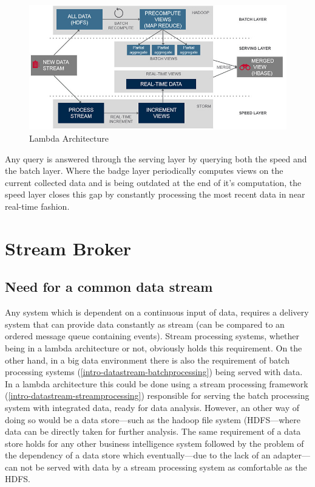 \begin{figure}[H]
    \centering
    \includegraphics[width=1.0\textwidth]{images/lambda-architecture.jpg}
    \caption{Lambda Architecture}
    \label{fig:lambda-Architecture}
\end{figure}

Any query is answered through the serving layer by querying both the speed and
the batch layer. Where the badge layer periodically computes views on the
current collected data and is being outdated at the end of it's computation, the
speed layer closes this gap by constantly processing the most recent data in
near real-time fashion. \cite{marz2015big} \cite{PrpSvyOfDSPS}

\section{Stream Broker}
\subsection{Need for a common data stream}
Any system which is dependent on a continuous input of data, requires a delivery
system that can provide data constantly as stream (can be
compared to an ordered message queue  containing events). Stream
processing systems, whether being in a lambda architecture or not, obviously
holds this requirement. On the other hand, in a big data environment there is
also the requirement of batch processing systems
(\ref{intro-datastream-batchprocessing}) being served with data. In a lambda
architecture this could be done using a stream processing framework
(\ref{intro-datastream-streamprocessing}) responsible for serving the batch
processing system with integrated data, ready for data analysis. However, an
other way of doing so would be a data store---such as the hadoop file system
(HDFS---where data can be directly taken for further analysis.
The same requirement of a data store holds for any
other business intelligence system followed by the problem of the dependency of
a data store which eventually---due to the lack of an adapter---can not be
served with data by a stream processing system as comfortable as the HDFS.

